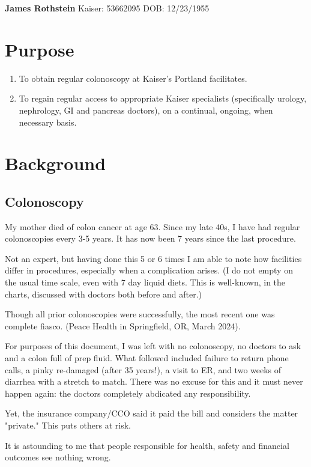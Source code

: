 \documentclass[11pt]{article}
\author{jim}
\date{\today}
\title{}
\begin{document}
\textbf{James Rothstein}
Kaiser: 53662095
DOB:  12/23/1955

\section{Purpose}
\label{sec:orgcc112e3}
\begin{enumerate}
\item To obtain regular colonoscopy at Kaiser's Portland facilitates.
\item To regain regular access to appropriate Kaiser specialists (specifically
urology, nephrology, GI and pancreas doctors), on a continual,
ongoing,  when necessary basis.
\end{enumerate}


\section{Background}
\label{sec:org9fda6ee}

\subsection{Colonoscopy}
\label{sec:org1828cef}
My mother died of colon cancer at age 63.  Since my late 40s, I have
had regular colonoscopies every 3-5 years.   It has now been 7 years since the last procedure.

Not an expert, but having done this 5 or 6 times I am able to note how
facilities differ in procedures, especially when a complication
arises. (I do not empty on the usual time scale, even with 7 day
liquid diets.  This is well-known, in the charts, discussed with doctors both
before and after.)


Though all prior colonoscopies were successfully, the most recent one was complete fiasco.
(Peace Health in Springfield, OR, March 2024).


For purposes of this document, I was left with no colonoscopy, no
doctors to ask and a colon full of prep fluid.  What followed included
failure to return phone calls, a pinky re-damaged (after 35 years!),
a visit to ER, and two weeks of diarrhea with a stretch to match.  There
was no excuse for this and it must never happen again: the doctors
completely abdicated any responsibility.

Yet, the insurance company/CCO said it
paid the bill and considers the matter "private."  This puts others at risk.

It is astounding to me that people responsible for health, safety and
financial outcomes see nothing wrong.
\end{document}
